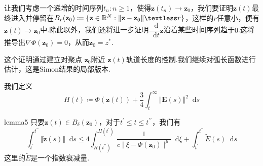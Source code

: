 \documentclass[11pt,a4paper]{article}
\newcommand*{\dif}{\mathop{}\!\mathrm{d}}%
\theoremstyle{definition}
\begin{document}
	让我们考虑一个递增的时间序列${t_{n}:n\geq1}$，使得$\textbf{z}(t_{n})\rightarrow\textbf{z}_{0}$，我们要证明$\textbf{z}(t)$最终进入并停留在$B_{r}(\textbf{z}_{0})\coloneqq\{\textbf{z}\in\mathbb{R}^{N}:\Vert\textbf{z}-\textbf{z}_{0}\Vert\textless r\}$，这样的$r$任意小，便有$\textbf{z}(t)\rightarrow\textbf{z}_{0}$中.除此以外，我们还将进一步证明$\dfrac{\dif}{\dif t}\textbf{z}$沿着某些时间序列趋于$0$.这将推导出$\nabla\Phi(\textbf{z}_{0})=0$，从而$\textbf{z}_{0}=z^{*}$.
	
	这个证明通过建立对聚点 $\textbf{z}_{0}$附近 $\textbf{z}(t)$轨道长度的控制.我们继续对弧长函数进行估计，这是Simon结果\cite{ref6}的局部版本.
	
	我们定义\[ H(t)\coloneqq\Phi(\textbf{z}(t))+\dfrac{3}{4}\int_{t}^{\infty}\Vert\textbf{E}(s)\Vert^{2}\dif s \]
	\begin{lemma}{}{lemma5}
		只要$\textbf{z}(t)\in B_{\delta}(\textbf{z}_{0})$，对于$t^{\prime}\leq t\leq
		t^{\prime\prime}$，我们有\[ \int_{t^{\prime}}^{t^{\prime\prime}}\Vert\dot{\textbf{z}}(s)\Vert\dif s\leq4\int_{H(t^{\prime\prime})}^{H(t^{\prime})}\dfrac{1}{c\mid\xi-\Phi(\textbf{z}_{0})\mid^{\mu}}\dif\xi+\int_{t^{\prime}}^{t^{\prime\prime}}\tilde{E}(s)\dif s \]这里的$\tilde{E}$是一个指数衰减量.
	\end{lemma}
\end{document}
